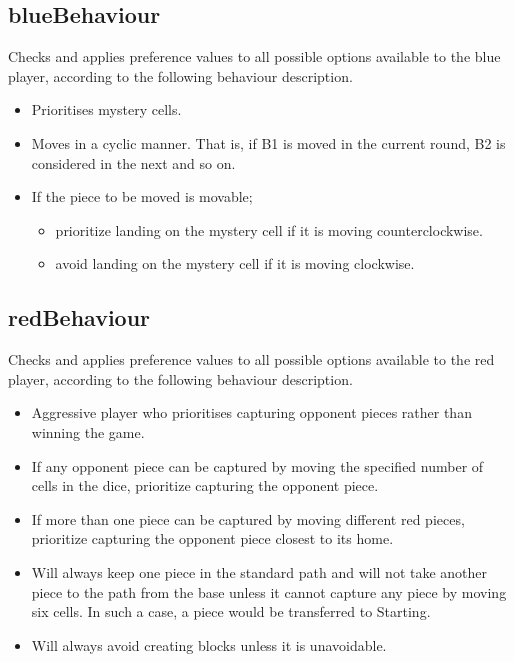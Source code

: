 \documentclass{article}
\begin{document}
\subsection{blueBehaviour}
Checks and applies preference values to all possible options available to the blue player, according to the following behaviour description.
\begin{itemize}
    \item Prioritises mystery cells.
    \item Moves in a cyclic manner. That is, if B1 is moved in the current round, B2 is considered in the next and so on.
    \item If the piece to be moved is movable;
    \begin{itemize}
        \item prioritize landing on the mystery cell if it is moving counterclockwise.
    \end{itemize}
    \begin{itemize}
        \item  avoid landing on the mystery cell if it is moving clockwise.
    \end{itemize}
\end{itemize}

\subsection{redBehaviour}
Checks and applies preference values to all possible options available to the red player, according to the following behaviour description.
\begin{itemize}
    \item Aggressive player who prioritises capturing opponent pieces rather than winning the game.
    \item If any opponent piece can be captured by moving the specified number of cells in the dice, prioritize capturing the opponent piece.
    \item If more than one piece can be captured by moving different red pieces, prioritize capturing the opponent piece closest to its home.
    \item Will always keep one piece in the standard path and will not take another piece to the path from the base unless it cannot capture any piece by moving six cells. In such a case, a piece would be transferred to Starting.
    \item Will always avoid creating blocks unless it is unavoidable.
\end{itemize}
\end{document}
